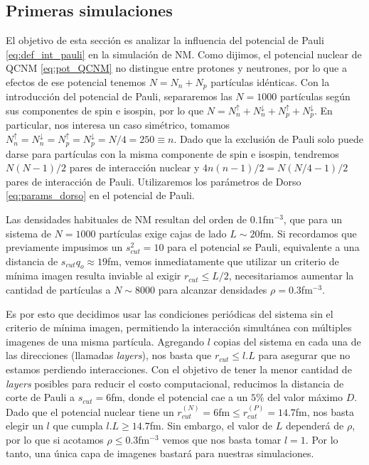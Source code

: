 \subsection{Primeras simulaciones}

El objetivo de esta sección es analizar la influencia del potencial de Pauli \eqref{eq:def_int_pauli} en la simulación de NM. 
Como dijimos, el potencial nuclear de QCNM \eqref{eq:pot_QCNM} no distingue entre protones y neutrones, por lo que a efectos de ese potencial tenemos $N=N_n+N_p$ partículas idénticas.
Con la introducción del potencial de Pauli, separaremos las $N=1000$ partículas según sus componentes de spin e isospin, por lo que $N = N_n^\uparrow+N_n^\downarrow+N_p^\uparrow+N_p^\downarrow$.
En particular, nos interesa un caso simétrico, tomamos $N_n^\uparrow=N_n^\downarrow=N_p^\uparrow=N_p^\downarrow = N/4 = 250\equiv n$.
Dado que la exclusión de Pauli solo puede darse para partículas con la misma componente de spin e isospin, tendremos $N(N-1)/2$ pares de interacción nuclear y $4n(n-1)/2 = N(N/4-1)/2$ pares de 
interacción de Pauli. 
Utilizaremos los parámetros de Dorso \eqref{eq:params_dorso} en el potencial de Pauli.

Las densidades habituales de NM resultan del orden de $0.1$fm$^{-3}$, que para un sistema de $N=1000$ partículas exige cajas de lado $L\sim 20$fm.
Si recordamos que previamente impusimos un $s_{cut}^2=10$ para el potencial se Pauli, equivalente a una distancia de $s_{cut}q_o \approx 19$fm, vemos inmediatamente que utilizar un criterio de
mínima imagen resulta inviable al exigir $r_{cut}\leq L/2$, necesitariamos aumentar la cantidad de partículas a $N\sim8000$ para alcanzar densidades $\rho=0.3$fm$^{-3}$.

Es por esto que decidimos usar las condiciones periódicas del sistema sin el criterio de mínima imagen, permitiendo la interacción simultánea con múltiples imagenes de una misma partícula.
Agregando $l$ copias del sistema en cada una de las direcciones (llamadas \textit{layers}), nos basta que $r_{cut}\leq l.L$ para asegurar que no estamos perdiendo interacciones.
Con el objetivo de tener la menor cantidad de \textit{layers} posibles para reducir el costo computacional, reducimos la distancia de corte de Pauli a $s_{cut}=6$fm, donde el potencial cae a un $5\%$
del valor máximo $D$.
Dado que el potencial nuclear tiene un $r_{cut}^{(N)} = 6$fm$\leq r_{cut}^{(P)} = 14.7$fm, nos basta elegir un $l$ que cumpla $l.L \geq 14.7$fm.
Sin embargo, el valor de $L$ dependerá de $\rho$, por lo que si acotamos $\rho\leq 0.3$fm$^{-3}$ vemos que nos basta tomar $l=1$.
Por lo tanto, una única capa de imagenes bastará para nuestras simulaciones.

